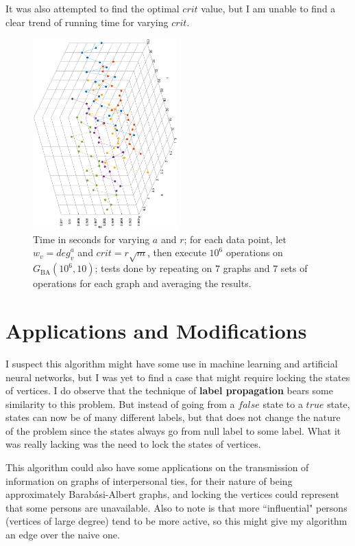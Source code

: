 \documentclass[12pt]{report}
\begin{document}
It was also attempted to find the optimal $ \mathit{crit} $ value,
but I am unable to find a clear trend of running time for varying $ \mathit{crit} $.

\begin{figure}
\centering
\includegraphics[width=2.2in,angle=-90]{graph/ba_crit_power.eps}
\caption{Time in seconds for varying $ a $ and $ r $; for each data point, let $ w_v = \mathit{deg}_v^a $ and $ \mathit{crit} = r \sqrt{m} $, then execute $ 10^6 $ operations on $ G_\mathrm{BA}(10^6, 10) $; tests done by repeating on $ 7 $ graphs and $ 7 $ sets of operations for each graph and averaging the results.}
\end{figure}

\pagebreak

\chapter{Applications and Modifications}

I suspect this algorithm might have some use in machine learning and artificial neural networks,
but I was yet to find a case that might require locking the states of vertices.
I do observe that the technique of \textbf{label propagation} bears some similarity to this problem.\cite{zhu02}
But instead of going from a $ \mathit{false} $ state to a $ \mathit{true} $ state,
states can now be of many different labels,
but that does not change the nature of the problem since the states always go from null label to some label.
What it was really lacking was the need to lock the states of vertices.

This algorithm could also have some applications on the transmission of information on graphs of interpersonal ties,
for their nature of being approximately Barabási-Albert graphs,
and locking the vertices could represent that some persons are unavailable.\cite{granovetter05}
Also to note is that more ``influential" persons (vertices of large degree) tend to be more active,
so this might give my algorithm an edge over the naive one.
\end{document}
